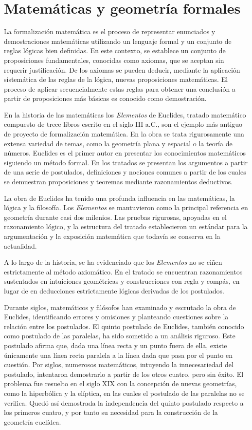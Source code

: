 \section{Matem\'{a}ticas y geometr\'{i}a formales}

La formalización matemática es el proceso de representar enunciados y
demostraciones matemáticas utilizando un lenguaje formal y un conjunto de reglas
lógicas bien definidas. En este contexto, se establece un conjunto de
proposiciones fundamentales, conocidas como axiomas, que se aceptan sin requerir
justificación. De los axiomas se pueden deducir, mediante la aplicación
sistemática de las reglas de la lógica, nuevas proposiciones matemáticas. El
proceso de aplicar secuencialmente estas reglas para obtener una conclusión a
partir de proposiciones más básicas es conocido como demostración.

En la historia de las matemáticas los \textit{Elementos} de Euclides, tratado
matemático compuesto de trece libros escrito en el siglo III a.C., son el
ejemplo más antiguo de proyecto de formalización matemática. En la obra se trata
rigurosamente una extensa variedad de temas, como la geometría plana y espacial
o la teoría de números. Euclides es el primer autor en presentar los
conocimientos matemáticos siguiendo un método formal. En los tratados se
presentan los argumentos a partir de una serie de postulados, definiciones y
nociones comunes a partir de los cuales se demuestran proposiciones y teoremas
mediante razonamientos deductivos.

La obra de Euclides ha tenido una profunda influencia en las matemáticas, la
lógica y la filosofía. Los \textit{Elementos} se mantuvieron como la principal
referencia en geometría durante casi dos milenios. Las pruebas rigurosas,
apoyadas en el razonamiento lógico, y la estructura del tratado establecieron un
estándar para la argumentación y la exposición matemática que todavía se
conserva en la actualidad.

A lo largo de la historia, se ha evidenciado que los \textit{Elementos} no se
ciñen estrictamente al método axiomático. En el tratado se encuentran
razonamientos sustentados en intuiciones geométricas y construcciones con regla
y compás, en lugar de en deducciones estrictamente lógicas derivadas de los
postulados.

Durante siglos, matemáticos y filósofos han examinado y escrutado la obra de
Euclides, identificando errores y omisiones y planteando cuestiones sobre la
relación entre los postulados. El quinto postulado de Euclides, también conocido
como postulado de las paralelas, ha sido sometido a un análisis riguroso. Este
postulado afirma que, dada una línea recta y un punto fuera de ella, existe
únicamente una línea recta paralela a la línea dada que pasa por el punto en
cuestión. Por siglos, numerosos matemáticos, intuyendo la innecesariedad del
postulado, intentaron demostrarlo a partir de los otros cuatro, pero sin éxito.
El problema fue resuelto en el siglo XIX con la concepción de nuevas geometrías,
como la hiperbólica y la elíptica, en las cuales el postulado de las paralelas
no se verifica. Quedó así demostrada la independencia del quinto postulado
respecto a los primeros cuatro, y por tanto su necesidad para la construcción de
la geometría euclídea.

